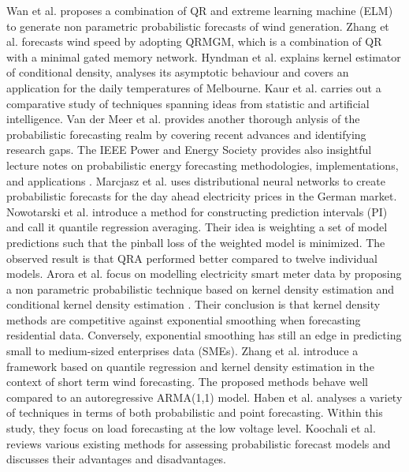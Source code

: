Wan et al. \cite{wan2016direct} proposes a combination of QR and extreme learning machine (ELM) to generate non parametric probabilistic forecasts of wind generation.
Zhang et al. \cite{zhang2019wind} forecasts wind speed by adopting QRMGM, which is a combination of QR with a minimal gated memory network.
Hyndman et al. \cite{hyndman1996estimating} explains kernel estimator of conditional density, analyses its asymptotic behaviour and covers an application for the daily temperatures of Melbourne.
Kaur et al. \cite{kaur2022energy} carries out a comparative study of techniques spanning ideas from statistic and artificial intelligence.
Van der Meer et al. \cite{van2018review} provides another thorough anlysis of the probabilistic forecasting realm by covering recent advances and identifying research gaps.
The IEEE Power and Energy Society provides also insightful lecture notes on probabilistic energy forecasting methodologies,
implementations, and applications \cite{gm_22}.
Marcjasz et al. \cite{probablistic_electricity_forecast2} uses distributional neural networks to create probabilistic forecasts for the day ahead electricity prices in the German market.
Nowotarski et al. \cite{nowotarski2015computing} introduce a method for constructing prediction intervals (PI) and call it quantile regression averaging. Their idea is weighting a set of model predictions such that the pinball loss of the weighted model is minimized. The observed result is that QRA performed better compared to twelve individual models.
Arora et al. \cite{arora2016forecasting} focus on modelling electricity smart meter data by proposing a non parametric probabilistic technique based on kernel density estimation and conditional kernel density estimation \cite{rosenblatt1969conditional, hyndman1996estimating}. Their conclusion is that kernel density methods are competitive against exponential smoothing when forecasting residential data. Conversely, exponential smoothing has still an edge in predicting small to medium-sized enterprises data (SMEs).
Zhang et al. \cite{zhang2020probability} introduce a framework based on quantile regression and kernel density estimation in the context of short term wind forecasting. The proposed methods behave well compared to an autoregressive ARMA(1,1) model.
Haben et al. \cite{haben2018short} analyses a variety of techniques in terms of both probabilistic and point forecasting. Within this study, they focus on load forecasting at the low voltage level.
Koochali et al. \cite{koochali2022random} reviews various existing methods for assessing probabilistic forecast models and discusses their advantages and disadvantages.
